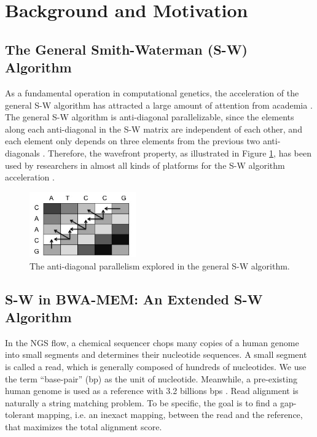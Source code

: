 \section{Background and Motivation} 
\label{sec:motivation}

\subsection{The General Smith-Waterman (S-W) Algorithm}
\label{subsec:general_SW}

As a fundamental operation in computational genetics, 
the acceleration of the general S-W algorithm has attracted a large amount of attention from academia \cite{Aluru2014}. 
The general S-W algorithm is anti-diagonal parallelizable, 
since the elements along each anti-diagonal in the S-W matrix are independent of each other, 
and each element only depends on three elements from the previous two anti-diagonals \cite{Edmiston1988}. 
Therefore, the wavefront property, as illustrated in Figure \ref{fig:F3C2}, 
has been used by researchers in almost all kinds of platforms for the S-W algorithm acceleration \cite{Wozniak1997}\cite{Arram2013}\cite{Preusser2012}\cite{Olson2012}\cite{RaceLogic}.
\begin{figure}[!hbt]
	\begin{center}
		\includegraphics[width=1.8in]{Figures/Figure3C2.jpg}
		\caption {The anti-diagonal parallelism explored in the general S-W algorithm.}
		\label{fig:F3C2}
	\end{center}
\end{figure}

\subsection{S-W in BWA-MEM: An Extended S-W Algorithm} 
\label{subsec:Smith-Waterman}
In the NGS flow, a chemical sequencer chops many copies of a human genome into small segments and determines their nucleotide sequences. 
A small segment is called a read, which is generally composed of hundreds of nucleotides. 
We use the term ``base-pair'' (bp) as the unit of nucleotide. %
Meanwhile, a pre-existing human genome is used as a reference with 3.2 billions bps \cite{Mardis2008}.
Read alignment is naturally a string matching problem. %
To be specific, the goal is to find a gap-tolerant mapping, i.e. an inexact mapping, between the read and the reference, that maximizes the total alignment score. 

